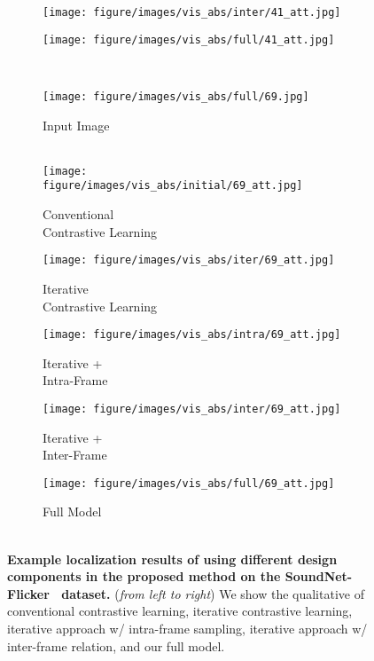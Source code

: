 \begin{figure*}[t!]
\begin{subfigure}[b]{.16\linewidth}
    \centering
    \texttt{[image: figure/images/vis\_abs/inter/41\_att.jpg]}
    \end{subfigure}
    \begin{subfigure}[b]{.16\linewidth}
    \centering
    \texttt{[image: figure/images/vis\_abs/full/41\_att.jpg]}
    \end{subfigure}
    \\
    \begin{subfigure}[b]{.16\linewidth}
    \centering
    \texttt{[image: figure/images/vis\_abs/full/69.jpg]}
    \caption{Input Image\\~}
    \end{subfigure}
    \begin{subfigure}[b]{.16\linewidth}
    \centering
    \texttt{[image: figure/images/vis\_abs/initial/69\_att.jpg]}
    \caption{Conventional \\Contrastive Learning}
    \end{subfigure}
    \begin{subfigure}[b]{.16\linewidth}
    \centering
    \texttt{[image: figure/images/vis\_abs/iter/69\_att.jpg]}
    \caption{Iterative \\ Contrastive Learning}
    \end{subfigure}  
    \begin{subfigure}[b]{.16\linewidth}
    \centering
    \texttt{[image: figure/images/vis\_abs/intra/69\_att.jpg]}
    \caption{Iterative +\\ Intra-Frame}
    \end{subfigure}
    \begin{subfigure}[b]{.16\linewidth}
    \centering
    \texttt{[image: figure/images/vis\_abs/inter/69\_att.jpg]}
    \caption{Iterative +\\ Inter-Frame}
    \end{subfigure}
    \begin{subfigure}[b]{.16\linewidth}
    \centering
    \texttt{[image: figure/images/vis\_abs/full/69\_att.jpg]}
    \caption{Full Model\\~}
    \end{subfigure}
  \caption{\textbf{Example localization results of using different design components in the proposed method on the SoundNet-Flicker~\cite{av_cvpr18_lls,av_tpami20_lls} dataset.} (\textit{from left to right}) We show the qualitative of conventional contrastive learning, iterative contrastive learning, iterative approach w/ intra-frame sampling, iterative approach w/ inter-frame relation, and our full model.
}
\end{figure*}
